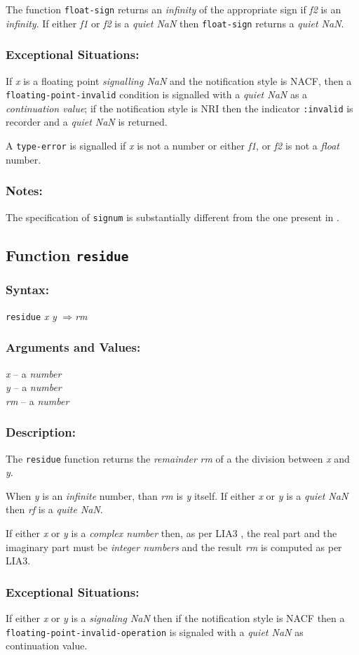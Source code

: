 \documentclass[10pt,fleqn]{article}
\newcommand{\code}[1]{\texttt{#1}}
\newcommand{\clliaterm}[1]{\textit{#1}}
\newcommand{\varname}[1]{\textit{#1}}
\newcommand{\clterm}[1]{\textit{#1}}
\newcommand{\RArrow}{$\Rightarrow$}
\newcommand{\DDictionaryItem}[1]{\vspace*{6pt}\noindent\hrulefill\vspace*{-9pt}\subsection*{#1}}
\newcommand{\DSyntax}{\subsubsection*{Syntax:}}
\newcommand{\DArgsNValues}{\subsubsection*{Arguments and Values:}}
\newcommand{\DDescription}{\subsubsection*{Description:}}
\newcommand{\DExceptional}{\subsubsection*{Exceptional Situations:}}
\newcommand{\DNotes}{\subsubsection*{Notes:}}
\begin{document}
The function \code{float-sign} returns an \clliaterm{infinity} of the
appropriate sign if \varname{f2} is an \clliaterm{infinity}.  If
either \varname{f1} or \varname{f2} is a \clliaterm{quiet NaN} then
\code{float-sign} returns a \clliaterm{quiet NaN}.

\DExceptional{}

If \varname{x} is a floating point \clliaterm{signalling NaN} and the
notification style is NACF, then a\\
\code{floating-point-invalid} condition is signalled with a
\clliaterm{quiet NaN} as a \emph{continuation value}; if the
notification style is NRI then the indicator \code{:invalid} is
recorder and a \clliaterm{quiet NaN} is returned.

A \code{type-error} is signalled if \varname{x} is not a number or
either \varname{f1}, or \varname{f2} is not a \clterm{float} number.


\DNotes{}

The specification of \code{signum} is substantially different from the
one present in \cite{1994:ANSICL}.


\DDictionaryItem{Function \code{residue}}
\index{R!\code{residue}}

\DSyntax{}

\code{residue} \varname{x} \varname {y} \RArrow \varname{rm}

\DArgsNValues{}

\varname{x} -- a \clterm{number}\\
\varname{y} -- a \clterm{number}\\
\varname{rm} -- a \clterm{number}


\DDescription{}

The \code{residue} function returns the \clliaterm{remainder}
\varname{rm} of a the division between \varname{x} and \varname{y}.

When \varname{y} is an \clliaterm{infinite} number, than \varname{rm}
is \varname{y} itself.  If either \varname{x} or \varname{y} is a
\clliaterm{quiet NaN} then \varname{rf} is a \clliaterm{quite NaN}.

If either \varname{x} or \varname{y} is a \clterm{complex number}
then, as per LIA3 \cite{2004:LIA3}, the real part and the imaginary
part must be \clterm{integer numbers} and the result \varname{rm} is
computed as per LIA3.


\DExceptional{}

If either \varname{x} or \varname{y} is a \clliaterm{signaling NaN}
then if the notification style is NACF then a\\
\code{floating-point-invalid-operation} is signaled with a
\clliaterm{quiet NaN} as continuation value.
\end{document}

